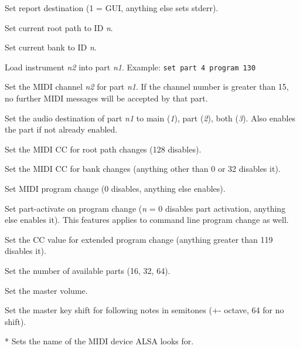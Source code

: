       Set report destination (1 = GUI, anything else sets stderr).

      Set current root path to ID \textsl{n}.

      Set current bank to ID \textsl{n}.

      Load instrument \textsl{n2} into part \textsl{n1}.
      Example: \texttt{set part 4 program 130}

      Set the MIDI channel \textsl{n2} for part \textsl{n1}.
      If the channel number is greater than 15, no further MIDI
      messages will be accepted by that part.

      Set the audio destination of part \textsl{n1}
      to main (\textsl{1}), part (\textsl{2}), both (\textsl{3}).
      Also enables the part if not already enabled.

      Set the MIDI CC for root path changes (128 disables).

      Set the MIDI CC for bank changes (anything other than 0 or 32
      disables it).

      Set MIDI program change (0 disables, anything else enables).

      Set part-activate on program change (\textsl{n} = 0 disables
      part activation, anything else enables it). This features
      applies to command line program change as well.

      Set the CC value for extended program change (anything greater
      than 119 disables it).

      Set the number of available parts (16, 32, 64).

      Set the master volume.

      Set the master key shift for following notes in semitones (+-
      octave, 64 for no shift).

      * Sets the name of the MIDI device ALSA looks for.

